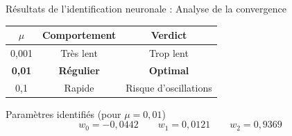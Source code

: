 \documentclass[aspectratio=169,12pt]{beamer}
\begin{document}
	\begin{frame}{\color{red}Résultats de l'identification neuronale : Analyse de la convergence}
		\vspace{6pt}
		\begin{center}
			\small
			\begin{tabular}{ccc}
				\toprule
				$\mu$ & Comportement & Verdict \\
				\midrule
				0,001 & Très lent & Trop lent \\
				\textbf{0,01} & \textbf{Régulier} & \textbf{Optimal} \\
				0,1 & Rapide & Risque d'oscillations \\
				\bottomrule
			\end{tabular}
		\end{center}
		
		\vspace{8pt}
		\begin{block}{Paramètres identifiés (pour $\mu = 0{,}01$)}
			\[
			w_0 = -0{,}0442 \qquad w_1 = 0{,}0121 \qquad w_2 = 0{,}9369
			\]
		\end{block}
	\end{frame}
\end{document}
